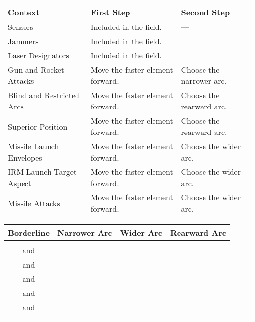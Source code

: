 \begin{twocolumntablefloat}

\begin{twocolumntable}


\begin{tabularx}{0.8\linewidth}{lLl}
\toprule
Context&First Step&Second Step\\
\midrule
Sensors&Included in the field.&---\\
Jammers&Included in the field.&---\\
Laser Designators&Included in the field.&---\\
Gun and Rocket Attacks&Move the faster element forward.&Choose the narrower arc.\\
Blind and Restricted Arcs&Move the faster element forward.&Choose the rearward arc.\\
Superior Position&Move the faster element forward.&Choose the rearward arc.\\
Missile Launch Envelopes&Move the faster element forward.&Choose the wider arc.\\
IRM Launch Target Aspect&Move the faster element forward.&Choose the wider arc.\\
Missile Attacks&Move the faster element forward.&Choose the wider arc.\\
\bottomrule
\end{tabularx}


\end{twocolumntable}

\vspace{\floatsep}

\begin{twocolumntable}


\begin{tabularx}{0.8\linewidth}{CCCC}
\toprule
Borderline&Narrower Arc&Wider Arc&Rearward Arc\\
\midrule
{}                                &\phantom{0}&\phantom{0}&\phantom{0}\\
\phantom{0} and \phantom{0}&\phantom{0}&\phantom{0}&\phantom{0}\\
\phantom{0} and \phantom{0}&\phantom{0}&\phantom{0}&\phantom{0}\\
\phantom{0} and \phantom{}&\phantom{0}&\phantom{}&\phantom{0}\\
\phantom{} and \phantom{}&\phantom{}&\phantom{}&\phantom{}\\
\phantom{} and \phantom{}&\phantom{}&\phantom{}&\phantom{}\\
                              &\phantom{}&\phantom{}&\phantom{}\\
\bottomrule
\end{tabularx}


\end{twocolumntable}
\end{twocolumntablefloat}
